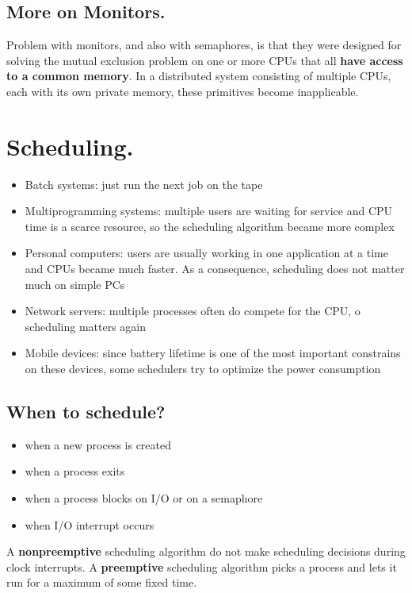 \documentclass{article}
\newcounter{exercise}
\newcounter{problem}[exercise]
\begin{document}
\subsection*{More on Monitors.}
\noindent

Problem with monitors, and also with semaphores, is that they were designed for solving the mutual exclusion problem on one or more CPUs that all \textbf{have access to a common memory}. In a distributed system consisting of multiple CPUs, each with its own private memory, these primitives become inapplicable.

\section*{Scheduling.}
\noindent

\begin{itemize}
  \item Batch systems: just run the next job on the tape 
  \item Multiprogramming systems: multiple users are waiting for service and CPU time is a scarce resource, so the scheduling algorithm became more complex 
  \item Personal computers: users are usually working in one application at a time and CPUs became much faster. As a consequence, scheduling does not matter much on simple PCs
  \item Network servers: multiple processes often do compete for the CPU, o scheduling matters again 
  \item Mobile devices: since battery lifetime is one of the most important constrains on these devices, some schedulers try to optimize the power consumption
\end{itemize}

\subsection*{When to schedule?}

\begin{itemize}
  \item when a new process is created 
  \item when a process exits
  \item when a process blocks on I/O or on a semaphore 
  \item when I/O interrupt occurs
\end{itemize}

A \textbf{nonpreemptive} scheduling algorithm do not make scheduling decisions during clock interrupts.
A \textbf{preemptive} scheduling algorithm picks a process and lets it run for a maximum of some fixed time. 
\end{document}
